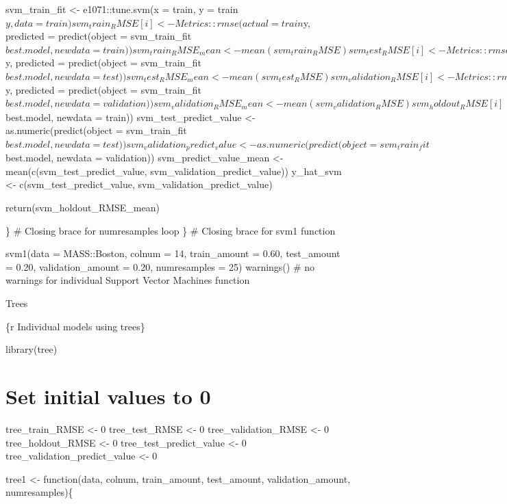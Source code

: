 \documentclass[
]{book}
\begin{document}
svm\_train\_fit \textless- e1071::tune.svm(x = train, y = train\(y, data = train)
  svm_train_RMSE[i] <- Metrics::rmse(actual = train\)y, predicted =
predict(object = svm\_train\_fit\(best.model, newdata = train))
  svm_train_RMSE_mean <- mean(svm_train_RMSE)
  svm_test_RMSE[i] <- Metrics::rmse(actual = test\)y, predicted =
predict(object = svm\_train\_fit\(best.model, newdata = test))
  svm_test_RMSE_mean <- mean(svm_test_RMSE)
  svm_validation_RMSE[i] <- Metrics::rmse(actual = validation\)y,
predicted = predict(object =
svm\_train\_fit\(best.model, newdata = validation))
  svm_validation_RMSE_mean <- mean(svm_validation_RMSE)
  svm_holdout_RMSE[i] <- mean(c(svm_test_RMSE_mean, svm_validation_RMSE_mean))
  svm_holdout_RMSE_mean <- mean(svm_holdout_RMSE)
  svm_holdout_RMSE_sd_mean <- sd(svm_validation_RMSE)
  svm_train_predict_value <- as.numeric(predict(object = svm_train_fit\)best.model,
newdata = train)) svm\_test\_predict\_value \textless- as.numeric(predict(object =
svm\_train\_fit\(best.model, newdata = test))
  svm_validation_predict_value <- as.numeric(predict(object = svm_train_fit\)best.model,
newdata = validation)) svm\_predict\_value\_mean \textless-
mean(c(svm\_test\_predict\_value, svm\_validation\_predict\_value)) y\_hat\_svm
\textless- c(svm\_test\_predict\_value, svm\_validation\_predict\_value)

return(svm\_holdout\_RMSE\_mean)

\} \# Closing brace for numresamples loop \} \# Closing brace for svm1
function

svm1(data = MASS::Boston, colnum = 14, train\_amount = 0.60, test\_amount
= 0.20, validation\_amount = 0.20, numresamples = 25) warnings() \# no
warnings for individual Support Vector Machines function

Trees

\{r Individual models using trees\}

library(tree)

\chapter{Set initial values to 0}\label{set-initial-values-to-0-20}

tree\_train\_RMSE \textless- 0 tree\_test\_RMSE \textless- 0 tree\_validation\_RMSE \textless- 0
tree\_holdout\_RMSE \textless- 0 tree\_test\_predict\_value \textless- 0
tree\_validation\_predict\_value \textless- 0

tree1 \textless- function(data, colnum, train\_amount, test\_amount,
validation\_amount, numresamples)\{
\end{document}
